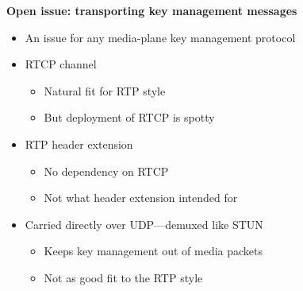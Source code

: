 \documentclass[helvetica,fancybox,landscape]{seminar}
\newcommand{\heading}[1]{%
  \begin{center} 
    \large\bf 
    #1 
  \end{center} 
  \vspace{.4 in}}
\begin{document}
\begin{slide}
\heading{Open issue: transporting key management messages}

\vspace{-.3 in}
\begin{itemize}
\item An issue for any media-plane key management protocol
\item RTCP channel
\begin{itemize}
\item Natural fit for RTP style
\item But deployment of RTCP is spotty
\end{itemize}
\item RTP header extension
\begin{itemize}
\item No dependency on RTCP
\item Not what header extension intended for
\end{itemize}
\item Carried directly over UDP---demuxed like STUN
\begin{itemize}
\item Keeps key management out of media packets
\item Not as good fit to the RTP style
\end{itemize}
\end{itemize}
\end{slide}
\end{document}
